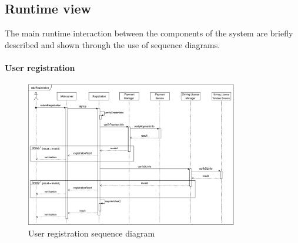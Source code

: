 \subsection{Runtime view}

The main runtime interaction between the components of the system are briefly described and shown through the use of sequence diagrams.

\paragraph{User registration}

\begin{figure}[h!]
	\includegraphics[width=350px]{../Datas/diagrams/registration.pdf}
	\caption{User registration sequence diagram}
	\label{fig:User-registration-seq-dig}
\end{figure}

\newpage
